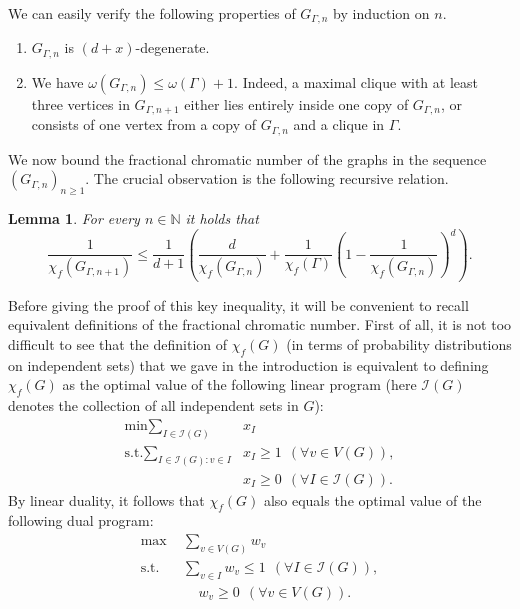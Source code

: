 \documentclass[10pt]{amsart}
\newtheorem{lemma}[theorem]{Lemma}
\theoremstyle{definition}
\begin{document}
We can easily verify the following properties of $G_{\Gamma, n}$ by induction on $n$.
\begin{enumerate}
    \item $G_{\Gamma, n}$ is $(d + x)$-degenerate.
    \item We have $\omega(G_{\Gamma, n}) \leq \omega(\Gamma) + 1$. Indeed, a maximal clique with at least three vertices in $G_{\Gamma, n + 1}$ either lies entirely inside one copy of $G_{\Gamma, n}$, or consists of one vertex from a copy of $G_{\Gamma, n}$ and a clique in $\Gamma$.
\end{enumerate}
We now bound the fractional chromatic number of the graphs in the sequence $(G_{\Gamma, n})_{n\ge 1}$. The crucial observation is the following recursive relation.
\begin{lemma}
\label{lem:fractional-recursion}
For every $n\in \mathbb{N}$ it holds that
$$\frac{1}{\chi_f(G_{\Gamma, n + 1})} \leq \frac{1}{d + 1} \left(\frac{d}{\chi_f(G_{\Gamma, n})} + \frac{1}{\chi_f(\Gamma)}\left(1 - \frac{1}{\chi_f(G_{\Gamma, n})}\right)^d\right).$$
\end{lemma}
Before giving the proof of this key inequality, it will be convenient to recall equivalent definitions of the fractional chromatic number. First of all, it is not too difficult to see that the definition of $\chi_f(G)$ (in terms of probability distributions on independent sets) that we gave in the introduction is equivalent to defining $\chi_f(G)$ as the optimal value of the following linear program (here $\mathcal{I}(G)$ denotes the collection of all independent sets in $G$):
\begin{align*}
\tag{P}
    \text{min} \sum_{I \in \mathcal{I}(G)}&{x_I} \\
    \text{s.t.} \sum_{I\in \mathcal{I}(G): v \in I}&{x_I}\ge 1~~(\forall v \in V(G)), \\
    & x_I \ge 0~~(\forall I \in \mathcal{I}(G)).
\end{align*}
By linear duality, it follows that $\chi_f(G)$ also equals the optimal value of the following dual program:\begin{align*}
\tag{D}
    \text{max} &\sum_{v\in V(G)}{w_v} \\
    \text{s.t.}~~~~&\sum_{v \in I}{w_v}\le 1~~(\forall I \in \mathcal{I}(G)), \\
    &~~~~~w_v \ge 0~~(\forall v\in V(G)).
\end{align*}
\end{document}
